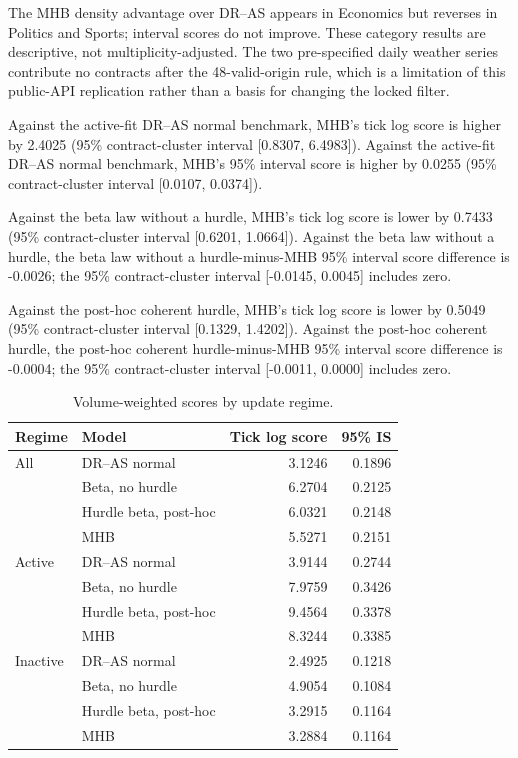 The MHB density advantage over DR--AS appears in Economics but reverses in Politics and Sports; interval scores do not improve. These category results are descriptive, not multiplicity-adjusted. The two pre-specified daily weather series contribute no contracts after the 48-valid-origin rule, which is a limitation of this public-API replication rather than a basis for changing the locked filter.

Against the active-fit DR--AS normal benchmark, MHB's tick log score is higher by 2.4025 (95\% contract-cluster interval [0.8307, 6.4983]).
Against the active-fit DR--AS normal benchmark, MHB's 95\% interval score is higher by 0.0255 (95\% contract-cluster interval [0.0107, 0.0374]).

Against the beta law without a hurdle, MHB's tick log score is lower by 0.7433 (95\% contract-cluster interval [0.6201, 1.0664]).
Against the beta law without a hurdle, the beta law without a hurdle-minus-MHB 95\% interval score difference is -0.0026; the 95\% contract-cluster interval [-0.0145, 0.0045] includes zero.

Against the post-hoc coherent hurdle, MHB's tick log score is lower by 0.5049 (95\% contract-cluster interval [0.1329, 1.4202]).
Against the post-hoc coherent hurdle, the post-hoc coherent hurdle-minus-MHB 95\% interval score difference is -0.0004; the 95\% contract-cluster interval [-0.0011, 0.0000] includes zero.

\begin{table}[ht]
\centering
\caption{Volume-weighted scores by update regime.}
\label{tab:regime-results}
\small
\begin{tabular}{llrr}
\toprule
Regime & Model & Tick log score & 95\% IS \\
\midrule
All & DR--AS normal & 3.1246 & 0.1896 \\
 & Beta, no hurdle & 6.2704 & 0.2125 \\
 & Hurdle beta, post-hoc & 6.0321 & 0.2148 \\
 & MHB & 5.5271 & 0.2151 \\
\addlinespace
Active & DR--AS normal & 3.9144 & 0.2744 \\
 & Beta, no hurdle & 7.9759 & 0.3426 \\
 & Hurdle beta, post-hoc & 9.4564 & 0.3378 \\
 & MHB & 8.3244 & 0.3385 \\
\addlinespace
Inactive & DR--AS normal & 2.4925 & 0.1218 \\
 & Beta, no hurdle & 4.9054 & 0.1084 \\
 & Hurdle beta, post-hoc & 3.2915 & 0.1164 \\
 & MHB & 3.2884 & 0.1164 \\
\bottomrule
\end{tabular}
\end{table}

